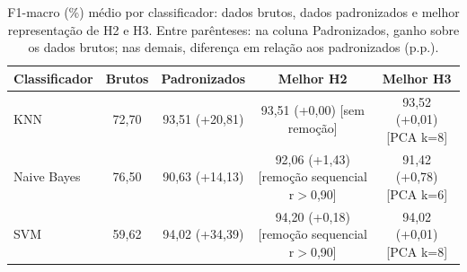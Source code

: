 \begin{table}[htbp]
    \centering
    \caption{F1-macro (\%) médio por classificador: dados brutos, dados padronizados e melhor representação de H2 e H3. Entre parênteses: na coluna Padronizados, ganho sobre os dados brutos; nas demais, diferença em relação aos padronizados (p.p.).}
    \label{tab:comparacao_geral}
    \footnotesize
    \begin{tabular}{lcccc}
        \toprule
        \textbf{Classificador} & \textbf{Brutos} & \textbf{Padronizados} & \textbf{Melhor H2} & \textbf{Melhor H3} \\
        \midrule
        KNN & 72,70 & 93,51 (+20,81) & 93,51 (+0,00) \scriptsize[sem remoção] & 93,52 (+0,01) \scriptsize[PCA k=8] \\
        Naive Bayes & 76,50 & 90,63 (+14,13) & 92,06 (+1,43) \scriptsize[remoção sequencial r$>$0{,}90] & 91,42 (+0,78) \scriptsize[PCA k=6] \\
        SVM & 59,62 & 94,02 (+34,39) & 94,20 (+0,18) \scriptsize[remoção sequencial r$>$0{,}90] & 94,02 (+0,01) \scriptsize[PCA k=8] \\
        \bottomrule
    \end{tabular}
\end{table}
